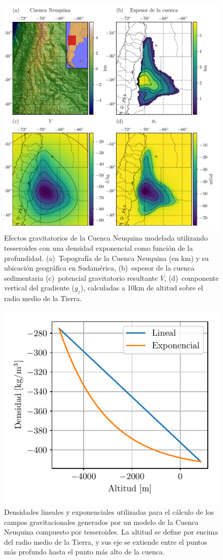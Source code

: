 \begin{figure}
\centering
\includegraphics[width=\linewidth]{figs/tesseroids-variable-density/neuquen-basin.pdf}
\caption{
    Efectos gravitatorios de la Cuenca Neuquina modelada utilizando tesseroides
    con una densidad exponencial como función de la profundidad.
    (a)~Topografía de la Cuenca Neuquina (en km) y su ubicación geográfica en
    Sudamérica,
    (b)~espesor de la cuenca sedimentaria \citep[en metros;][]{heine2007}
    (c)~potencial gravitatorio resultante $V$,
    (d)~componente vertical del gradiente ($g_z$),
    calculadas a 10km de altitud sobre el radio medio de la Tierra.
}
\label{fig:neuquen-basin}
\end{figure}

\begin{figure}
\centering
\includegraphics[width=0.5\linewidth]{figs/tesseroids-variable-density/neuquen-basin-densities.pdf}
\caption{
    Densidades lineales y exponenciales utilizadas para el cálculo de los
    campos gravitacionales generados por un modelo de la Cuenca Neuquina
    compuesto por tesseroides.
    La altitud se define por encima del radio medio de la Tierra, y sus eje se
    extiende entre el puntos más profundo hasta el punto más alto de la cuenca.
}
\label{fig:neuquen-basin-densities}
\end{figure}


